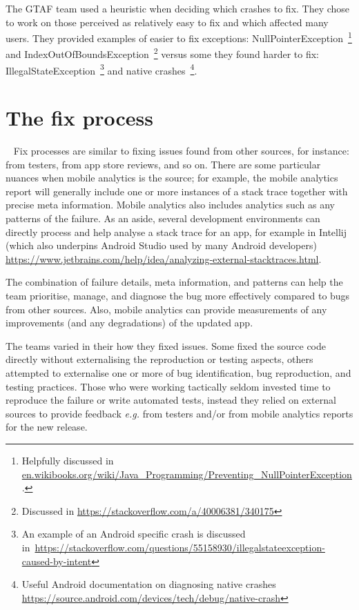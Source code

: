 
The GTAF team used a heuristic when deciding which crashes to fix. They chose to work on those perceived as relatively easy to fix and which affected many users. They provided examples of easier to fix exceptions: NullPointerException~\footnote{Helpfully discussed in \href{https://en.wikibooks.org/wiki/Java\_Programming/Preventing\_NullPointerException}{en.wikibooks.org/wiki/Java\_Programming/Preventing\_NullPointerException}.} and IndexOutOfBoundsException~\footnote{Discussed in \url{https://stackoverflow.com/a/40006381/340175}} versus some they found harder to fix: IllegalStateException~\footnote{An example of an Android specific crash is discussed in~\url{https://stackoverflow.com/questions/55158930/illegalstateexception-caused-by-intent}} and native crashes~\footnote{Useful Android documentation on diagnosing native crashes \url{https://source.android.com/devices/tech/debug/native-crash}}.


\section{The fix process}~\label{aiu-the-fix-process-section}
Fix processes are similar to fixing issues found from other sources, for instance: from testers, from app store reviews, and so on. There are some particular nuances when mobile analytics is the source; for example, the mobile analytics report will generally include one or more instances of a stack trace together with precise meta information. Mobile analytics also includes analytics such as any patterns of the failure. As an aside, several development environments can directly process and help analyse a stack trace for an app, for example in Intellij (which also underpins Android Studio used by many Android developers) \url{https://www.jetbrains.com/help/idea/analyzing-external-stacktraces.html}. 

The combination of failure details, meta information, and patterns can help the team prioritise, manage, and diagnose the bug more effectively compared to bugs from other sources. Also, mobile analytics can provide measurements of any improvements (and any degradations) of the updated app.

The teams varied in their how they fixed issues. Some fixed the source code directly without externalising the reproduction or testing aspects, others attempted to externalise one or more of bug identification, bug reproduction, and testing practices. Those who were working tactically seldom invested time to reproduce the failure or write automated tests, instead they relied on external sources to provide feedback \emph{e.g.} from testers and/or from mobile analytics reports for the new release.  

